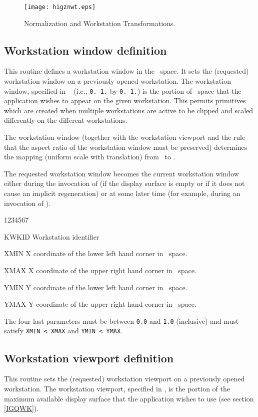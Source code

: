 \begin{figure}[p]
\texttt{[image: higznwt.eps]}
\caption{Normalization and Workstation Transformations.}
\label{NTWT}
\end{figure}
\clearpage

\subsection{Workstation window definition}

\Action
This routine defines a workstation window in the \NDC~space.
It sets the (requested) workstation window on a previously opened
workstation. The workstation window, specified in \NDC~
(i.e., {\tt0.-1.} by {\tt0.-1.}) is the portion of \NDC~space that the
application wishes to appear on the given workstation. This permits primitives
which are created when multiple workstations are active to be clipped and scaled
differently on the different workstations.

The workstation window (together with the workstation viewport and the rule that
the aspect ratio of the workstation window must be preserved) determines the
mapping (uniform scale with translation) from \NDC~to \DC.

The requested workstation window becomes the current workstation window either
during the invocation of  (if the display surface is empty or if it
does not cause an implicit regeneration) or at some later time (for example,
during an invocation of ).
\Pdesc
\begin{DLtt}{1234567}
\item[KWKID]Workstation identifier
\item[XMIN] X coordinate of the lower left hand corner in \ndc~space.
\item[XMAX] X coordinate of the upper right hand corner in \ndc~space.
\item[YMIN] Y coordinate of the lower left hand corner in \ndc~space.
\item[YMAX] Y coordinate of the upper right hand corner in \ndc~space.
\end{DLtt}
The four last parameters must be between {\tt0.0} and {\tt1.0}
(inclusive) and must satisfy {\tt XMIN < XMAX} and {\tt YMIN < YMAX}.
%
\subsection{Workstation viewport definition}
\Action
This routine sets the (requested) workstation viewport on a previously opened
workstation. The workstation viewport, specified in \DC, is the
portion of the maximum available display surface that the application wishes to
use (see section \ref{IGQWK}).

